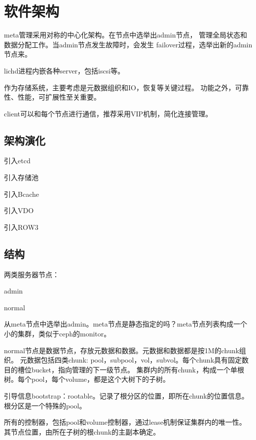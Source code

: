 \chapter{软件架构}

meta管理采用对称的中心化架构。在节点中选举出admin节点，
管理全局状态和数据分配工作。当admin节点发生故障时，会发生
failover过程，选举出新的admin节点来。

lichd进程内嵌各种server，包括iscsi等。

作为存储系统，主要考虑是元数据组织和IO，恢复等关键过程。
功能之外，可靠性、性能，可扩展性至关重要。

client可以和每个节点进行通信，推荐采用VIP机制，简化连接管理。

\section{架构演化}

\begin{enumbox}
\item{引入etcd}
\item{引入存储池}
\item{引入Bcache}
\item{引入VDO}
\item{引入ROW3}
\end{enumbox}

\section{结构}

两类服务器节点：
\begin{compactenum}
\item admin
\item normal
\end{compactenum}

从meta节点中选举出admin。meta节点是静态指定的吗？meta节点列表构成一个小的集群，类似于ceph的monitor。

normal节点是数据节点，存放元数据和数据。元数据和数据都是按1M的chunk组织。
元数据包括四类chunk: pool，subpool，vol，subvol。每个chunk具有固定数目的槽位bucket，指向管理的下一级节点。
集群内的所有chunk，构成一个单根树。每个pool，每个volume，都是这个大树下的子树。

引导信息bootstrap：rootable。记录了根分区的位置，即所在chunk的位置信息。根分区是一个特殊的pool。

所有的控制器，包括pool和volume控制器，通过lease机制保证集群内的唯一性。
其节点位置，由所在子树的根chunk的主副本确定。

